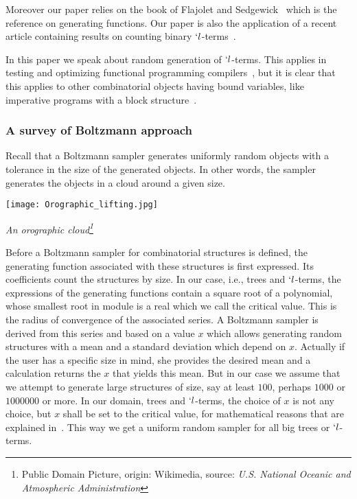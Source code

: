 \documentclass{sig-alternate}
\begin{document}
Moreover our paper relies on the book of Flajolet and
Sedgewick~\cite{flajolet08:_analy_combin} which is the reference on generating
functions.  Our paper is also the application of a recent article containing results
on counting binary $`l$-terms~\cite{DBLP:journals/corr/GrygielL14}.



In this paper we speak about random generation of $`l$-terms.  This applies in
testing and optimizing functional programming
compilers~\cite{Palka:2011:TOC:1982595.1982615,palka12:_testin_compil}, but it is
clear that this applies to other combinatorial objects having bound variables, like
imperative programs with a block structure~\cite{DBLP:conf/pldi/YangCER11}.

\subsubsection*{A survey of Boltzmann approach}
Recall that a Boltzmann sampler  generates uniformly  random objects with a
tolerance in the size of the generated objects.  In other words, the sampler
generates the objects in a cloud around a given size.
\begin{center}
  \texttt{[image: Orographic\_lifting.jpg]}

  {\tiny \it An orographic cloud\footnote{Public Domain Picture, origin: Wikimedia,
      source: \emph{U.S. National Oceanic and Atmospheric Administration}}}
\end{center}


Before a Boltzmann sampler for combinatorial structures is defined, the generating
function associated with these structures is first expressed.  Its coefficients count
the structures by size.  In our case, i.e., trees and $`l$-terms, the expressions of
the generating functions contain a square root of a polynomial, whose smallest root
in module is a real which we call the critical value.  This is the radius of
convergence of the associated series.  A Boltzmann sampler is derived from this
series and based on a value $x$ which allows generating random structures with a mean
and a standard deviation which depend on $x$.  Actually if the user has a specific
size in mind, she provides the desired mean and a calculation returns the $x$ that
yields this mean.  But in our case we assume that we attempt to generate large
structures of size, say at least $100$, perhaps $1000$ or $1000000$ or more. In our
domain, trees and $`l$-terms, the choice of $x$ is not any choice, but $x$ shall be
set to the critical value, for mathematical reasons that are explained
in~\cite{DBLP:journals/cpc/DuchonFLS04}.  This way we get a uniform random sampler
for all big trees or $`l$-terms.
\end{document}
